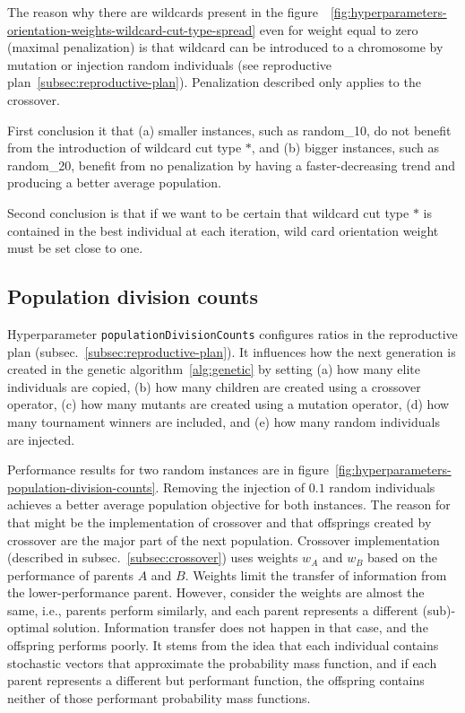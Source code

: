 The reason why there are wildcards present in the figure~~\ref{fig:hyperparameters-orientation-weights-wildcard-cut-type-spread}
even for weight equal to zero (maximal penalization) is that wildcard can be introduced to a chromosome by mutation
or injection random individuals (see reproductive plan~\ref{subsec:reproductive-plan}).
Penalization described only applies to the crossover.

First conclusion it that (a) smaller instances, such as random\_10, do not benefit from the introduction of wildcard cut type $*$,
and (b) bigger instances, such as random\_20, benefit from no penalization by having a faster-decreasing trend and producing a better average population.

Second conclusion is that if we want to be certain that wildcard cut type $*$ is contained in the best individual at each iteration,
wild card orientation weight must be set close to one.

\subsection{Population division counts}\label{subsec:population-division-counts}
Hyperparameter \verb|populationDivisionCounts| configures ratios in the reproductive plan (subsec.~\ref{subsec:reproductive-plan}).
It influences how the next generation is created in the genetic algorithm~\ref{alg:genetic}
by setting (a) how many elite individuals are copied, (b) how many children are created using a crossover operator,
(c) how many mutants are created using a mutation operator, (d) how many tournament winners are included,
and (e) how many random individuals are injected.

Performance results for two random instances are in figure~\ref{fig:hyperparameters-population-division-counts}.
Removing the injection of $0.1$ random individuals achieves a better average population objective for both instances.
The reason for that might be the implementation of crossover and that offsprings created by crossover
are the major part of the next population.
Crossover implementation (described in subsec.~\ref{subsec:crossover}) uses weights $w_A$ and $w_B$
based on the performance of parents $A$ and $B$.
Weights limit the transfer of information from the lower-performance parent.
However, consider the weights are almost the same, i.e., parents perform similarly, and each parent represents a different (sub)-optimal solution. Information transfer does not happen in that case, and the offspring performs poorly.
It stems from the idea that each individual contains stochastic vectors that approximate the probability mass
function, and if each parent represents a different but performant function, the offspring contains
neither of those performant probability mass functions.

